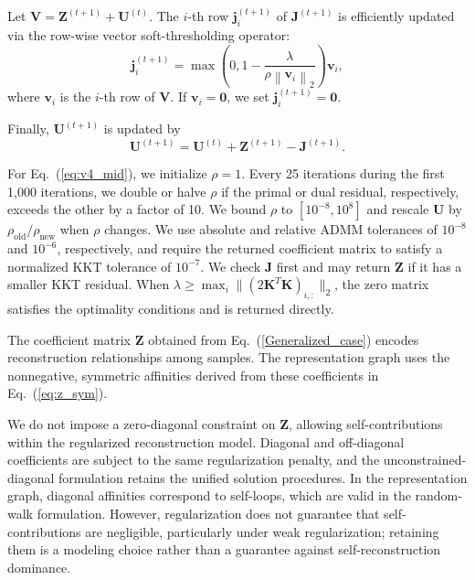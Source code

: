\documentclass[ASNA,twocolumn]{USG} %
\begin{document}
Let $\boldsymbol{V} = \boldsymbol{Z}^{(t+1)} + \boldsymbol{U}^{(t)}$. The $i$-th row $\boldsymbol{j}_i^{(t+1)}$ of $\boldsymbol{J}^{(t+1)}$ is efficiently updated via the row-wise vector soft-thresholding operator:
\begin{equation}
\boldsymbol{j}_i^{(t+1)} = \max \left( 0, 1 - \frac{\lambda}{\rho \left\|\boldsymbol{v}_i\right\|_2} \right) \boldsymbol{v}_i,
\end{equation}
where $\boldsymbol{v}_i$ is the $i$-th row of $\boldsymbol{V}$. If $\boldsymbol v_i=\boldsymbol0$, we set $\boldsymbol j_i^{(t+1)}=\boldsymbol0$.

Finally, $\boldsymbol{U}^{(t+1)}$ is updated by
\begin{equation}
\boldsymbol{U}^{(t+1)} = \boldsymbol{U}^{(t)} + \boldsymbol{Z}^{(t+1)} - \boldsymbol{J}^{(t+1)}.
\end{equation}

For Eq.~(\ref{eq:v4_mid}), we initialize $\rho=1$. Every 25 iterations during the first 1,000 iterations, we double or halve $\rho$ if the primal or dual residual, respectively, exceeds the other by a factor of 10. We bound $\rho$ to $[10^{-8},10^8]$ and rescale $\boldsymbol{U}$ by $\rho_{\mathrm{old}}/\rho_{\mathrm{new}}$ when $\rho$ changes. We use absolute and relative ADMM tolerances of $10^{-8}$ and $10^{-6}$, respectively, and require the returned coefficient matrix to satisfy a normalized KKT tolerance of $10^{-7}$. We check $\boldsymbol{J}$ first and may return $\boldsymbol{Z}$ if it has a smaller KKT residual. When $\lambda\ge\max_i\lVert(2\boldsymbol{K}^T \boldsymbol{K})_{i,:}\rVert_2$, the zero matrix satisfies the optimality conditions and is returned directly.

The coefficient matrix $\boldsymbol{Z}$ obtained from Eq.~(\ref{Generalized_case}) encodes reconstruction relationships among samples. The representation graph uses the nonnegative, symmetric affinities derived from these coefficients in Eq.~(\ref{eq:z_sym}).

We do not impose a zero-diagonal constraint on $\boldsymbol{Z}$, allowing self-contributions within the regularized reconstruction model. Diagonal and off-diagonal coefficients are subject to the same regularization penalty, and the unconstrained-diagonal formulation retains the unified solution procedures. In the representation graph, diagonal affinities correspond to self-loops, which are valid in the random-walk formulation. However, regularization does not guarantee that self-contributions are negligible, particularly under weak regularization; retaining them is a modeling choice rather than a guarantee against self-reconstruction dominance.
\end{document}
